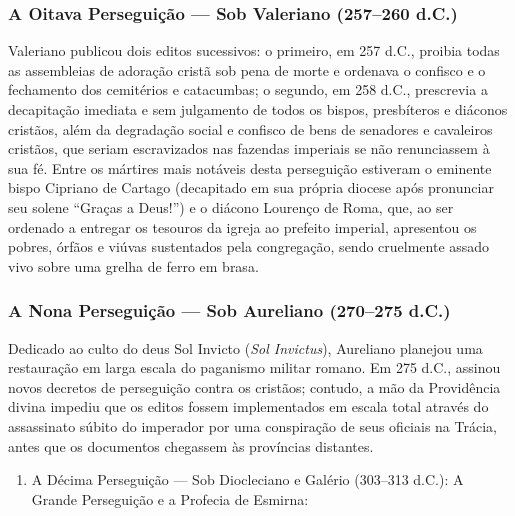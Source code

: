 \subsubsection*{A Oitava Perseguição — Sob Valeriano (257–260 d.C.)}
Valeriano publicou dois editos sucessivos: o primeiro, em 257 d.C., proibia todas as assembleias de adoração cristã sob pena de morte e ordenava o confisco e o fechamento dos cemitérios e catacumbas; o segundo, em 258 d.C., prescrevia a decapitação imediata e sem julgamento de todos os bispos, presbíteros e diáconos cristãos, além da degradação social e confisco de bens de senadores e cavaleiros cristãos, que seriam escravizados nas fazendas imperiais se não renunciassem à sua fé. Entre os mártires mais notáveis desta perseguição estiveram o eminente bispo Cipriano de Cartago (decapitado em sua própria diocese após pronunciar seu solene ``Graças a Deus!'') e o diácono Lourenço de Roma, que, ao ser ordenado a entregar os tesouros da igreja ao prefeito imperial, apresentou os pobres, órfãos e viúvas sustentados pela congregação, sendo cruelmente assado vivo sobre uma grelha de ferro em brasa.


\subsubsection*{A Nona Perseguição — Sob Aureliano (270–275 d.C.)}
Dedicado ao culto do deus Sol Invicto (\textit{Sol Invictus}), Aureliano planejou uma restauração em larga escala do paganismo militar romano. Em 275 d.C., assinou novos decretos de perseguição contra os cristãos; contudo, a mão da Providência divina impediu que os editos fossem implementados em escala total através do assassinato súbito do imperador por uma conspiração de seus oficiais na Trácia, antes que os documentos chegassem às províncias distantes.

\begin{enumerate}
  \item A Décima Perseguição — Sob Diocleciano e Galério (303–313 d.C.): A Grande Perseguição e a Profecia de Esmirna:
\end{enumerate}

